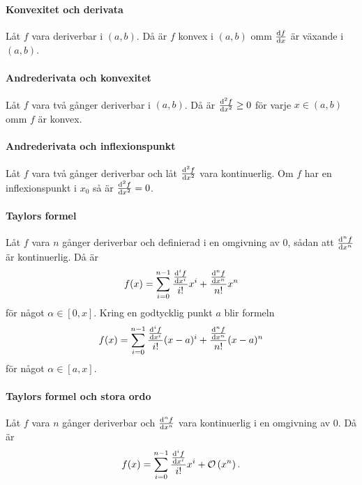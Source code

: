 \proof

\paragraph{Konvexitet och derivata}
Låt $f$ vara deriverbar i $(a, b)$. Då är $f$ konvex i $(a, b)$ omm $\dv{f}{x}$ är växande i $(a, b)$.

\proof

\paragraph{Andrederivata och konvexitet}
Låt $f$ vara två gånger deriverbar i $(a, b)$. Då är $\dv[2]{f}{x} (x)\geq 0$ för varje $x\in (a, b)$ omm $f$ är konvex.

\proof

\paragraph{Andrederivata och inflexionspunkt}
Låt $f$ vara två gånger deriverbar och låt $\dv[2]{f}{x}$ vara kontinuerlig. Om $f$ har en inflexionspunkt i $x_0$ så är $\dv[2]{f}{x} (x_0) = 0$.

\proof

\paragraph{Taylors formel}
Låt $f$ vara $n$ gånger deriverbar och definierad i en omgivning av $0$, sådan att $\dv[n]{f}{x}$ är kontinuerlig. Då är
\begin{align*}
	f(x) = \sum\limits_{i = 0}^{n - 1}\frac{\dv[i]{f}{x} (0)}{i!}x^i + \frac{\dv[n]{f}{x} (\alpha)}{n!}x^n
\end{align*}
för något $\alpha\in [0, x]$. Kring en godtycklig punkt $a$ blir formeln
\begin{align}
	f(x) = \sum\limits_{i = 0}^{n - 1}\frac{\dv[i]{f}{x} (a)}{i!}(x - a)^i + \frac{\dv[n]{f}{x} (\alpha)}{n!}(x - a)^n
	\label{eq:taylor_formula}
\end{align}
för något $\alpha\in [a, x]$.

\proof

\paragraph{Taylors formel och stora ordo}
Låt $f$ vara $n$ gånger deriverbar och $\dv[n]{f}{x}$ vara kontinuerlig i en omgivning av $0$. Då är
\begin{align*}
	f(x) = \sum\limits_{i = 0}^{n - 1}\frac{\dv[i]{f}{x} (0)}{i!}x^i + \mathcal{O}\left(x^n\right).
\end{align*}

\proof